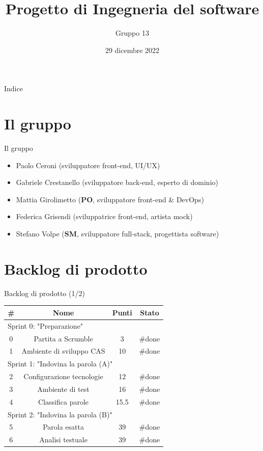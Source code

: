 \documentclass{beamer}
\title{Progetto di Ingegneria del software}
\author{Gruppo 13}
\institute{Università di Bologna}
\date{29 dicembre 2022}
\begin{document}
\begin{frame}
	\titlepage
\end{frame}

\begin{frame}{Indice}
	\tableofcontents
\end{frame}

\section{Il gruppo}
\begin{frame}{Il gruppo}
	\begin{itemize}
		\item Paolo Ceroni (sviluppatore front-end, UI/UX)
		\item Gabriele Crestanello (sviluppatore back-end, esperto di dominio)
		\item Mattia Girolimetto (\textbf{PO}, sviluppatore front-end \& DevOps)
		\item Federica Grisendi (sviluppatrice front-end, artista mock)
		\item Stefano Volpe (\textbf{SM}, sviluppatore full-stack, progettista software)
	\end{itemize}
\end{frame}

\section{Backlog di prodotto}
\begin{frame}{Backlog di prodotto (1/2)}
	\begin{table}
		\begin{tabular}{|c|c|c|c|}
			\hline
			\textbf{\#} & \textbf{Nome}             & \textbf{Punti} & \textbf{Stato} \\
			\hline
			\multicolumn{4}{|l|}{Sprint 0: "Preparazione"}                            \\
			\hline
			0           & Partita a Scrumble        & 3              & \#done         \\
			\hline
			1           & Ambiente di sviluppo CAS  & 10             & \#done         \\
			\hline
			\multicolumn{4}{|l|}{Sprint 1: "Indovina la parola (A)"}                  \\
			\hline
			2           & Configurazione tecnologie & 12             & \#done         \\
			\hline
			3           & Ambiente di test          & 16             & \#done         \\
			\hline
			4           & Classifica parole         & 15.5           & \#done         \\
			\hline
			\multicolumn{4}{|l|}{Sprint 2: "Indovina la parola (B)"}                  \\
			\hline
			5           & Parola esatta             & 39             & \#done         \\
			\hline
			6           & Analisi testuale          & 39             & \#done         \\
			\hline
		\end{tabular}
	\end{table}
\end{frame}
\end{document}
